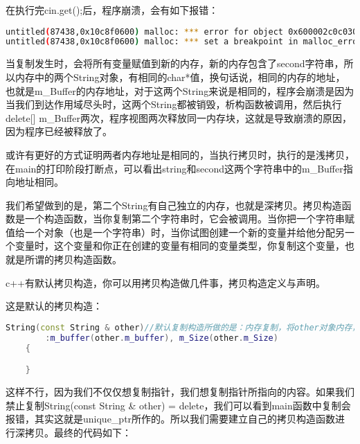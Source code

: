 在执行完{\ncodestyle cin.get();}后，程序崩溃，会有如下报错：

\begin{lstlisting}[language=bash]
untitled(87438,0x10c8f0600) malloc: *** error for object 0x600002c0c030: pointer being freed was not allocated
untitled(87438,0x10c8f0600) malloc: *** set a breakpoint in malloc_error_break to debug
\end{lstlisting}

当复制发生时，会将所有变量赋值到新的内存，新的内存包含了{\ncodestyle second}字符串，所以内存中的两个{\ncodestyle String}对象，有相同的{\ncodestyle char*}值，换句话说，相同的内存的地址，也就是{\ncodestyle m_Buffer}的内存地址，对于这两个{\ncodestyle String}来说是相同的，程序会崩溃是因为当我们到达作用域尽头时，这两个{\ncodestyle String}都被销毁，析构函数被调用，然后执行{\ncodestyle delete[] m_Buffer}两次，程序视图两次释放同一内存块，这就是导致崩溃的原因，因为程序已经被释放了。

或许有更好的方式证明两者内存地址是相同的，当执行拷贝时，执行的是浅拷贝，在{\ncodestyle main}的打印阶段打断点，可以看出{\ncodestyle string}和{\ncodestyle second}这两个字符串中的{\ncodestyle m_Buffer}指向地址相同。

我们希望做到的是，第二个{\ncodestyle String}有自己独立的内存，也就是深拷贝。拷贝构造函数是一个构造函数，当你复制第二个字符串时，它会被调用。当你把一个字符串赋值给一个对象（也是一个字符串）时，当你试图创建一个新的变量并给他分配另一个变量时，这个变量和你正在创建的变量有相同的变量类型，你复制这个变量，也就是所谓的拷贝构造函数。

c++有默认拷贝构造，你可以用拷贝构造做几件事，拷贝构造定义与声明。

这是默认的拷贝构造：

\begin{lstlisting}[language=c++]
    String(const String & other)//默认复制构造所做的是：内存复制，将other对象内存，浅拷贝进这些成员变量
        :m_buffer(other.m_buffer), m_Size(other.m_Size)
    {

    }
\end{lstlisting}

这样不行，因为我们不仅仅想复制指针，我们想复制指针所指向的内容。如果我们禁止复制{\ncodestyle String(const String \& other) = delete}，我们可以看到{\ncodestyle main}函数中复制会报错，其实这就是{\ncodestyle unique_ptr}所作的。所以我们需要建立自己的拷贝构造函数进行深拷贝。最终的代码如下：

